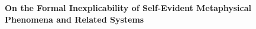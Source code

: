 \documentclass[runningheads]{llncs}
\begin{document}
\begin{center}
	{\Large\bfseries\boldmath
		On the Formal Inexplicability of Self-Evident Metaphysical Phenomena and Related Systems
		\par}
	\vskip 0.8cm
\end{center}
\end{document}
